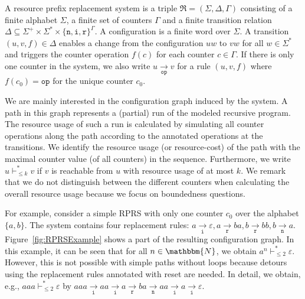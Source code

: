 \documentclass{LMCS}
\newcommand{\apath}[2][]{\xrightarrow[#1]{#2}}
\newcommand{\nat}{\mathbbm{N}}
\newcommand{\eps}{\varepsilon}
\newcommand{\prsR}{\mathfrak R}
\newcommand{\configstepsLesserCost}[2][*]{\vdash^{#1}_{\le #2}}
\newcommand{\iOp}{\ensuremath{\mathtt{i}}}
\newcommand{\rOp}{\ensuremath{\mathtt{r}}}
\newcommand{\nOp}{\ensuremath{\mathtt{n}}}
\newcommand{\RPRS}{\textsf{RPRS}}
\begin{document}
\begin{defi}
  A resource prefix replacement system is a triple $\prsR =
(\Sigma,\Delta,\Gamma)$ consisting of a finite  alphabet $\Sigma$, a finite set
of counters $\Gamma$ and a finite transition relation $\Delta \subseteq \Sigma^+
\times \Sigma^* \times \{\nOp,\iOp,\rOp\}^\Gamma$. A configuration is a finite
word over $\Sigma$. A transition $(u,v,f) \in \Delta$ enables a change from the
configuration $uw$ to $vw$ for all $w \in \Sigma^*$ and triggers the counter
operation $f(c)$ for each counter $c \in \Gamma$. If there is only one counter
in the system, we also write $u \apath[\mathtt{op}]{} v$ for a rule
$(u,v,f)$ where $f(c_0) = \mathtt{op}$ for the unique counter $c_0$.
\end{defi}

We are mainly interested in the configuration graph induced by the system. A
path in this graph represents a (partial) run of the modeled recursive program.
The resource usage of such a run is calculated by simulating all counter
operations along the path according to the annotated operations at the
transitions.  We identify the resource usage (or resource-cost) of the path with
the maximal counter value (of all counters) in the sequence. Furthermore, we
write $u \configstepsLesserCost{k} v$ if $v$ is reachable from $u$ with resource
usage of at most $k$. We remark that we do not distinguish between the different
counters when calculating the overall resource usage because we focus on
boundedness questions. 



For example, consider a simple \RPRS{} with only one counter $c_0$ over the
alphabet $\{a,b\}$. The system contains four replacement rules: $a
\apath[\iOp]{} \eps , a \apath[\rOp]{} ba, b \apath[\rOp]{} bb, b \apath[\nOp]{}
a$. Figure~\ref{fig:RPRSExample} shows a part of the resulting configuration
graph. In this example, it can be seen that for all $n \in \nat$, we obtain $a^n
\configstepsLesserCost{2} \eps$. However, this is not possible with simple paths
without loops because detours using the replacement rules annotated with reset
are needed. In detail, we obtain, e.g., $aaa \configstepsLesserCost{2} \eps$ by
$aaa \apath[\iOp]{} aa \apath[\iOp]{} a \apath[\rOp]{} ba \apath[\nOp]{} aa
\apath[\iOp]{} a \apath[\iOp]{} \eps$.
\end{document}
